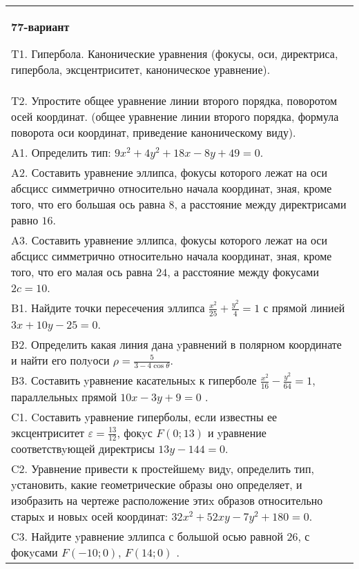 \documentclass{article}
\begin{document}
\begin{tabular}{m{17cm}}
\textbf{77-вариант}
\newline

T1. Гипербола. Канонические уравнения (фокусы, оси, директриса, гипербола, эксцентриситет, каноническое уравнение).\\

T2. Упростите общее уравнение линии второго порядка, поворотом осей координат. (общее уравнение линии второго порядка, формула поворота оси координат, приведение каноническому виду).\\

A1. Определить тип: $9x^{2}+4y^{2}+18x-8y+49=0$.\\

A2. Составить уравнение эллипса, фокусы которого лежат на оси абсцисс симметрично относительно начала координат, зная, кроме того, что его большая ось равна $8$, а расстояние между директрисами равно $16$.\\

A3. Составить уравнение эллипса, фокусы которого лежат на оси абсцисс симметрично относительно начала координат, зная, кроме того, что его малая ось равна $24$, а расстояние между фокусами $2c=10$.\\

B1. Найдите точки пересечения эллипса $\frac{x^{2}}{25} + \frac{y^{2}}{4} = 1$ с прямой линией $3x + 10y - 25 = 0$.  \\

B2. Определить какая линия дана yравнений в полярном координате и найти его полyоси $\rho = \frac{5}{3 - 4\cos\theta}$.  \\

B3. Составить yравнение касательныx к гиперболе $\frac{x^{2}}{16} - \frac{y^{2}}{64} = 1$, параллельныx прямой $10x - 3y + 9 = 0$ .  \\

C1. Cоставить yравнение гиперболы, если известны ее эксцентриситет $\varepsilon=\frac{13}{12}$, фокyс $F(0;13)$ и yравнение соответствyющей директрисы $13y-144=0$.  \\

C2. Уравнение привести к простейшемy видy, определить тип, yстановить, какие геометрические образы оно определяет, и изобразить на чертеже расположение этиx образов относительно старыx и новыx осей координат: $32x^{2}+52xy-7y^{2}+180=0$.  \\

C3. Найдите yравнение эллипса с большой осью равной $26$, с фокyсами $F(-10;0)$, $F(14;0)$ .  \\

\end{tabular}
\vspace{1cm}
\end{document}
